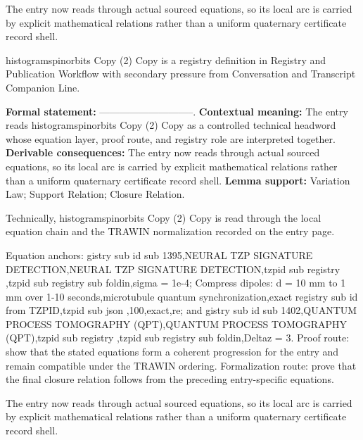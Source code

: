 The entry now reads through actual sourced equations, so its local arc is carried by explicit mathematical relations rather than a uniform quaternary certificate record shell.
\clearpage


\begingroup\small
{}
histogramspinorbits Copy (2) Copy is a registry definition in Registry and Publication Workflow with secondary pressure from Conversation and Transcript Companion Line.

\begingroup\footnotesize\setlength{\emergencystretch}{3em}\sloppy
\textbf{Formal statement:} -----------------------------. \textbf{Contextual meaning:} The entry reads histogramspinorbits Copy (2) Copy as a controlled technical headword whose equation layer, proof route, and registry role are interpreted together. \textbf{Derivable consequences:} The entry now reads through actual sourced equations, so its local arc is carried by explicit mathematical relations rather than a uniform quaternary certificate record shell. \textbf{Lemma support:} Variation Law; Support Relation; Closure Relation.\par
\endgroup

Technically, histogramspinorbits Copy (2) Copy is read through the local equation chain and the TRAWIN normalization recorded on the entry page.

Equation anchors: gistry sub id sub 1395,NEURAL TZP SIGNATURE DETECTION,NEURAL TZP SIGNATURE DETECTION,tzpid sub registry ,tzpid sub registry sub foldin,sigma = 1e-4; Compress dipoles: d = 10 mm to 1 mm over 1-10 seconds,microtubule quantum synchronization,exact registry sub id from TZPID,tzpid sub json ,100,exact,re; and gistry sub id sub 1402,QUANTUM PROCESS TOMOGRAPHY (QPT),QUANTUM PROCESS TOMOGRAPHY (QPT),tzpid sub registry ,tzpid sub registry sub foldin,Deltaz = 3. Proof route: show that the stated equations form a coherent progression for the entry and remain compatible under the TRAWIN ordering. Formalization route: prove that the final closure relation follows from the preceding entry-specific equations.

The entry now reads through actual sourced equations, so its local arc is carried by explicit mathematical relations rather than a uniform quaternary certificate record shell.
\endgroup

